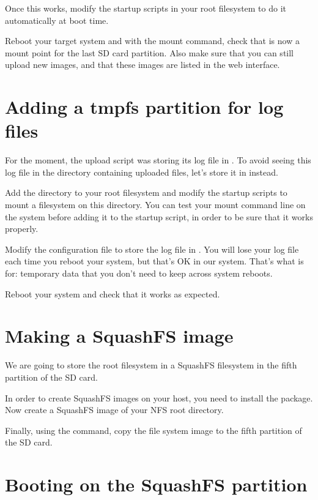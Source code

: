 Once this works, modify the startup scripts in your root filesystem
to do it automatically at boot time.

Reboot your target system and with the mount command, check that
 is now a mount point for the last SD card
partition. Also make sure that you can still upload new images, and
that these images are listed in the web interface.

\section{Adding a tmpfs partition for log files}

For the moment, the upload script was storing its log file in
. To avoid seeing this log file in
the directory containing uploaded files, let's store it in
 instead.

Add the  directory to your root filesystem and modify
the startup scripts to mount a  filesystem on this
directory. You can test your  mount command line on the
system before adding it to the startup script, in order to be sure
that it works properly.

Modify the  configuration file to store
the log file in . You will lose your log
file each time you reboot your system, but that's OK in our
system. That's what  is for: temporary data that you don't need
to keep across system reboots.

Reboot your system and check that it works as expected.

\section{Making a SquashFS image}

We are going to store the root filesystem in a SquashFS filesystem in
the fifth partition of the SD card.

In order to create SquashFS images on your host, you need to install
the  package. Now create a SquashFS image of your
NFS root directory.

Finally, using the  command, copy the file system image to
the fifth partition of the SD card.

\section{Booting on the SquashFS partition}

